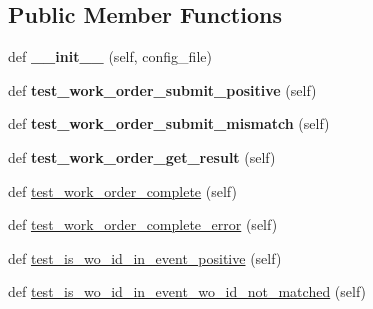 \subsection*{Public Member Functions}
\begin{DoxyCompactItemize}
\item 
\mbox{\label{classtest__ethereum__work__order__impl_1_1TestEthereumWorkOrderProxyImpl_a40e3add8460a021ca301d6a30673de6e}} 
def {\bfseries \+\_\+\+\_\+init\+\_\+\+\_\+} (self, config\+\_\+file)
\item 
\mbox{\label{classtest__ethereum__work__order__impl_1_1TestEthereumWorkOrderProxyImpl_a96731caf6ae8cd64c870f585bee3a184}} 
def {\bfseries test\+\_\+work\+\_\+order\+\_\+submit\+\_\+positive} (self)
\item 
\mbox{\label{classtest__ethereum__work__order__impl_1_1TestEthereumWorkOrderProxyImpl_aa5720100766a3b08ceaa1119e329e71b}} 
def {\bfseries test\+\_\+work\+\_\+order\+\_\+submit\+\_\+mismatch} (self)
\item 
\mbox{\label{classtest__ethereum__work__order__impl_1_1TestEthereumWorkOrderProxyImpl_a3d2e607d88e879419f4caf4e33ed08a6}} 
def {\bfseries test\+\_\+work\+\_\+order\+\_\+get\+\_\+result} (self)
\item 
def \hyperlink{classtest__ethereum__work__order__impl_1_1TestEthereumWorkOrderProxyImpl_a35411737dc8d8b17fe713d1c21bafaa1}{test\+\_\+work\+\_\+order\+\_\+complete} (self)
\item 
def \hyperlink{classtest__ethereum__work__order__impl_1_1TestEthereumWorkOrderProxyImpl_a610f6967fb83e2b3f372381d1bf74600}{test\+\_\+work\+\_\+order\+\_\+complete\+\_\+error} (self)
\item 
def \hyperlink{classtest__ethereum__work__order__impl_1_1TestEthereumWorkOrderProxyImpl_a6e31108d58b3e2d81bd534f6ca663dcc}{test\+\_\+is\+\_\+wo\+\_\+id\+\_\+in\+\_\+event\+\_\+positive} (self)
\item 
def \hyperlink{classtest__ethereum__work__order__impl_1_1TestEthereumWorkOrderProxyImpl_a81787de9421b858587a7e50f2ddbc734}{test\+\_\+is\+\_\+wo\+\_\+id\+\_\+in\+\_\+event\+\_\+wo\+\_\+id\+\_\+not\+\_\+matched} (self)

\end{DoxyCompactItemize}

